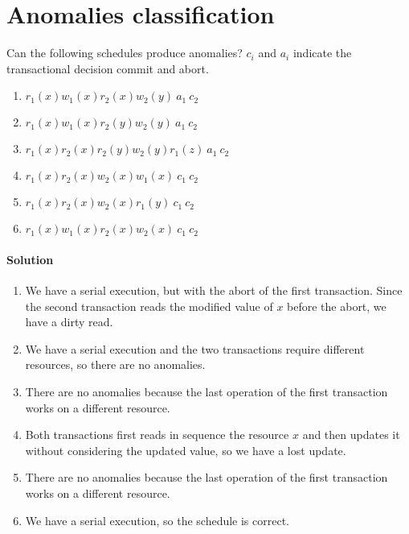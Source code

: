 \section{Anomalies classification}

Can the following schedules produce anomalies? $c_i$ and $a_i$ indicate the transactional decision commit and abort. 
\begin{enumerate}
    \item $r_1(x) w_1(x) r_2(x) w_2(y)\:a_1\:c_2$
    \item $r_1(x) w_1(x) r_2(y) w_2(y)\:a_1\:c_2$
    \item $r_1(x) r_2(x) r_2(y) w_2(y) r_1(z)\:a_1\:c_2$
    \item $r_1(x) r_2(x) w_2(x) w_1(x)\:c_1\:c_2$
    \item $r_1(x) r_2(x) w_2(x) r_1(y)\:c_1\:c_2$
    \item $r_1(x) w_1(x) r_2(x) w_2(x)\:c_1\:c_2$
\end{enumerate}

\paragraph*{Solution}
\begin{enumerate}
    \item We have a serial execution, but with the abort of the first transaction. Since the second transaction reads the modified value of $x$ before the abort, we have a
        dirty read. 
    \item We have a serial execution and the two transactions require different resources, so there are no anomalies.
    \item There are no anomalies because the last operation of the first transaction works on a different resource. 
    \item Both transactions first reads in sequence the resource $x$ and then updates it without considering the updated value, so we have a lost update. 
    \item There are no anomalies because the last operation of the first transaction works on a different resource. 
    \item We have a serial execution, so the schedule is correct. 
\end{enumerate}